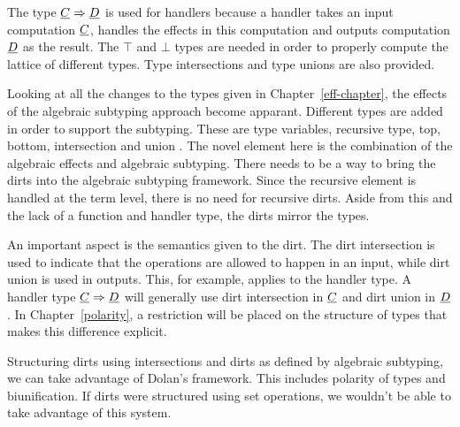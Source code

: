 The type $\underline{C} \Rightarrow \underline{D}$ is used for handlers because a handler takes an input computation $\underline{C}$, handles the effects in this computation and outputs computation $\underline{D}$ as the result. \cite{handling} The $\top$ and $\bot$ types are needed in order to properly compute the lattice of different types. Type intersections and type unions are also provided. \cite{mlsub}

Looking at all the changes to the types given in Chapter~\ref{eff-chapter}, the effects of the algebraic subtyping approach become apparant. Different types are added in order to support the subtyping. These are type variables, recursive type, top, bottom, intersection and union \cite{mlsub}. The novel element here is the combination of the algebraic effects and algebraic subtyping. There needs to be a way to bring the dirts into the algebraic subtyping framework. Since the recursive element is handled at the term level, there is no need for recursive dirts. Aside from this and the lack of a function and handler type, the dirts mirror the types.

An important aspect is the semantics given to the dirt. The dirt intersection is used to indicate that the operations are allowed to happen in an input, while dirt union is used in outputs. This, for example, applies to the handler type. A handler type $\underline{C} \Rightarrow \underline{D}$ will generally use dirt intersection in $\underline{C}$ and dirt union in $\underline{D}$. In Chapter~\ref{polarity}, a restriction will be placed on the structure of types that makes this difference explicit.

Structuring dirts using intersections and dirts as defined by algebraic subtyping, we can take advantage of Dolan's framework. This includes polarity of types and biunification. If dirts were structured using set operations, we wouldn't be able to take advantage of this system.

